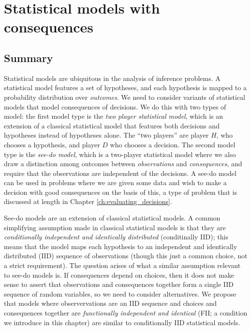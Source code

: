 

\chapter{Statistical models with consequences}\label{ch:2p_statmodels}


\section{Summary}

Statistical models are ubiquitous in the analysis of inference problems. A statistical model features a set of hypotheses, and each hypothesis is mapped to a probability distribution over \emph{outcomes}. We need to consider variants of statistical models that model consequences of decisions. We do this with two types of model: the first model type is the \emph{two player statistical model}, which is an extension of a classical statistical model that features both decisions and hypotheses instead of hypotheses alone. The ``two players'' are player $H$, who chooses a hypothesis, and player $D$ who chooses a decision. The second model type is the \emph{see-do model}, which is a two-player statistical model where we also draw a distinction among outcomes between \emph{observations} and \emph{consequences}, and require that the observations are independent of the decisions. A see-do model can be used in problems where we are given some data and wish to make a decision with good consequences on the basis of this, a type of problem that is discussed at length in Chapter \ref{ch:evaluating_decisions}.

See-do models are an extension of classical statistical models. A common simplifying assumption made in classical statistical models is that they are \emph{conditionally independent and identically distributed} (conditinally IID); this means that the model maps each hypothesis to an independent and identically distributed (IID) sequence of observations (though this just a common choice, not a strict requirement). The question arises of what a similar assumption relevant to see-do models is. If consequences depend on choices, then it does not make sense to assert that observations and consequences together form a single IID sequence of random variables, so we need to consider alternatives. We propose that models where observervations are an IID sequence and choices and consequences together are \emph{functionally independent and identical} (FII; a condition we introduce in this chapter) are similar to conditionally IID statistical models. 

